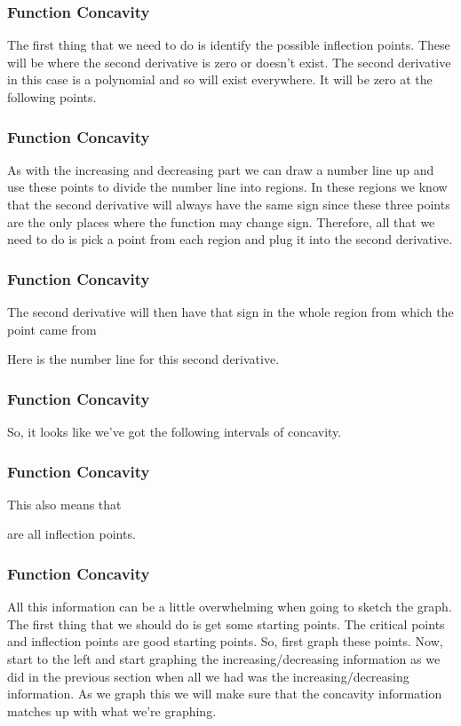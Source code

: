 \documentclass{beamer}
\begin{document}
\begin{frame} 
	\frametitle{Function Concavity} 
 The first thing that we need to do is identify the possible inflection points.  These will be where the second derivative is zero or doesn’t exist.  The second derivative in this case is a polynomial and so will exist everywhere.  It will be zero at the following points.
 
\end{frame}
\begin{frame} 
	\frametitle{Function Concavity}
 As with the increasing and decreasing part we can draw a number line up and use these points to divide the number line into regions.  In these regions we know that the second derivative will always have the same sign since these three points are the only places where the function may change sign.  Therefore, all that we need to do is pick a point from each region and plug it into the second derivative.  
 
\end{frame}
\begin{frame} 
	\frametitle{Function Concavity}The second derivative will then have that sign in the whole region from which the point came from
 
 Here is the number line for this second derivative.
\end{frame}
\begin{frame} 
	\frametitle{Function Concavity} 
 So, it looks like we’ve got the following intervals of concavity.
 
\end{frame}
\begin{frame} 
	\frametitle{Function Concavity} 
 This also means that
 
 are all inflection points.
\end{frame}
\begin{frame} 
	\frametitle{Function Concavity} 
 All this information can be a little overwhelming when going to sketch the graph.  The first thing that we should do is get some starting points.  The critical points and inflection points are good starting points.  So, first graph these points.  Now, start to the left and start graphing the increasing/decreasing information as we did in the previous section when all we had was the increasing/decreasing information.  As we graph this we will make sure that the concavity information matches up with what we’re graphing.
\end{frame}
\end{document}

